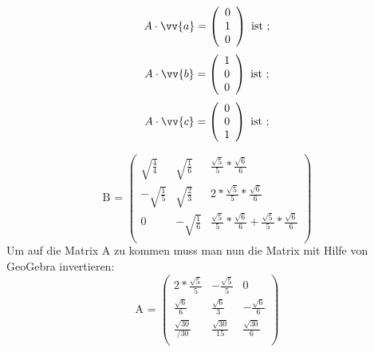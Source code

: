      $$A\cdot \vv{a}=\left(\begin{array}{c} 
     0\\1\\0\end{array}\right)\mbox{ ist ;} $$
     $$A\cdot \vv{b}=\left(\begin{array}{c} 
     1\\0\\0\end{array}\right)\mbox{ ist ;} $$
     $$A\cdot \vv{c}=\left(\begin{array}{c} 
     0\\0\\1\end{array}\right)\mbox{ ist ;} $$
     
$$\mbox{B = } \left(\begin{array}{ccc}
\sqrt{\frac{4}{4}}&\sqrt{\frac{1}{6}}&\frac{\sqrt{5}}{5}*\frac{\sqrt{6}}{6}\\
-\sqrt{\frac{1}{5}}&\sqrt{\frac{2}{3}}&2*\frac{\sqrt{5}}{5}*\frac{\sqrt{6}}{6}\\
0&-\sqrt{\frac{1}{6}}&\frac{\sqrt{5}}{5}*\frac{\sqrt{6}}{6}+\frac{ \sqrt{5}}{5}*\frac{\sqrt{6}}{6}\\
\end{array}\right)$$
Um auf die Matrix A zu kommen muss man nun die Matrix mit Hilfe von GeoGebra invertieren:
$$\mbox{A = }\left(\begin{array}{ccc}
2*\frac{\sqrt{5}}{5}&-\frac{\sqrt{5}}{5}&0\\
\frac{\sqrt{6}}{6}&\frac{\sqrt{6}}{3}&-\frac{\sqrt{6}}{6}\\
\frac{\sqrt{30}}{/30}&\frac{\sqrt{30}}{15}&\frac{\sqrt{30}}{6}\\
\end{array}\right)$$